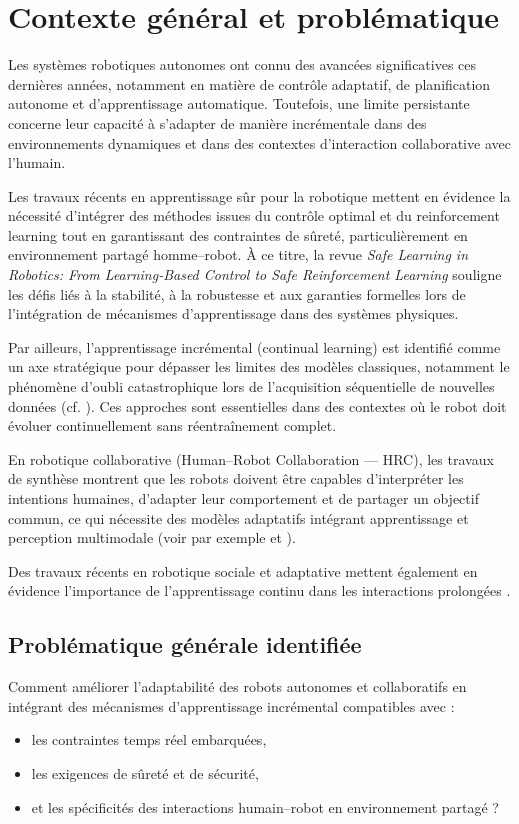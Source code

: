 \section{Contexte général et problématique}

Les systèmes robotiques autonomes ont connu des avancées significatives ces dernières années, notamment en matière de contrôle adaptatif, de planification autonome et d’apprentissage automatique. Toutefois, une limite persistante concerne leur capacité à s’adapter de manière incrémentale dans des environnements dynamiques et dans des contextes d’interaction collaborative avec l’humain.

Les travaux récents en apprentissage sûr pour la robotique mettent en évidence la nécessité d’intégrer des méthodes issues du contrôle optimal et du reinforcement learning tout en garantissant des contraintes de sûreté, particulièrement en environnement partagé homme–robot. À ce titre, la revue \textit{Safe Learning in Robotics: From Learning-Based Control to Safe Reinforcement Learning} \cite{safe_learning_robotics} souligne les défis liés à la stabilité, à la robustesse et aux garanties formelles lors de l’intégration de mécanismes d’apprentissage dans des systèmes physiques.

Par ailleurs, l’apprentissage incrémental (continual learning) est identifié comme un axe stratégique pour dépasser les limites des modèles classiques, notamment le phénomène d’oubli catastrophique lors de l’acquisition séquentielle de nouvelles données (cf. \cite{continual_learning_benchmarks}). Ces approches sont essentielles dans des contextes où le robot doit évoluer continuellement sans réentraînement complet.

En robotique collaborative (Human–Robot Collaboration — HRC), les travaux de synthèse montrent que les robots doivent être capables d’interpréter les intentions humaines, d’adapter leur comportement et de partager un objectif commun, ce qui nécessite des modèles adaptatifs intégrant apprentissage et perception multimodale (voir par exemple \cite{hrc_synthesis} et \cite{mdpi_platform_data}).

Des travaux récents en robotique sociale et adaptative mettent également en évidence l’importance de l’apprentissage continu dans les interactions prolongées \cite{frobt_2024}.

\subsection{Problématique générale identifiée}

Comment améliorer l’adaptabilité des robots autonomes et collaboratifs en intégrant des mécanismes d’apprentissage incrémental compatibles avec :
\begin{itemize}
    \item les contraintes temps réel embarquées,
    \item les exigences de sûreté et de sécurité,
    \item et les spécificités des interactions humain–robot en environnement partagé ?
\end{itemize}
